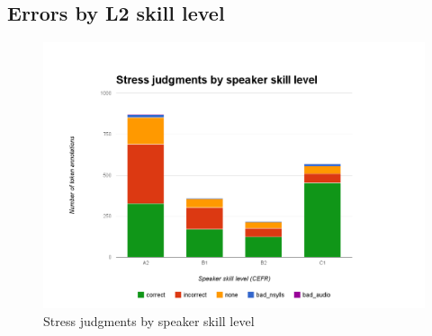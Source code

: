 		\subsection{Errors by L2 skill level}
		\label{sec:results:level}
		
			
			\begin{figure}[htb]
				\centering
				\includegraphics[width=\textwidth]{img/annotation/skillLevelBars}
				\caption{Stress judgments by speaker skill level }
				\label{fig:levelbars}
			\end{figure}
		
